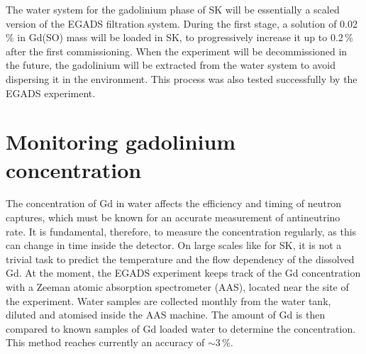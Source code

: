 The water system for the gadolinium phase of SK will be essentially a scaled version of the EGADS filtration system.
During the first stage, a solution of 0.02\,\% in Gd(SO) mass will be loaded in SK, %
to progressively increase it up to 0.2\,\% after the first commissioning.
When the experiment will be decommissioned in the future, the gadolinium will be extracted from the water system %
to avoid dispersing it in the environment.
This process was also tested successfully by the EGADS experiment.

\section{Monitoring gadolinium concentration}
\label{sec:gad}

The concentration of Gd in water affects the efficiency and timing of neutron captures, %
which must be known for an accurate measurement of antineutrino rate.
It is fundamental, therefore, to measure the concentration regularly, as this can change in time inside the detector.
On large scales like for SK, it is not a trivial task to predict the temperature and the flow dependency %
of the dissolved Gd.
At the moment, the EGADS experiment keeps track of the Gd concentration with a Zeeman atomic absorption spectrometer (AAS), %
located near the site of the experiment.
Water samples are collected monthly from the water tank, diluted and atomised inside the AAS machine.
The amount of Gd is then compared to known samples of Gd loaded water to determine the concentration.
This method reaches currently an accuracy of $\sim3$\,\%.

